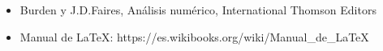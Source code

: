 
\begin{itemize}
\item Burden y J.D.Faires, Análisis numérico, International Thomson Editors
\item Manual de LaTeX: https://es.wikibooks.org/wiki/Manual_de_LaTeX
\end{itemize}